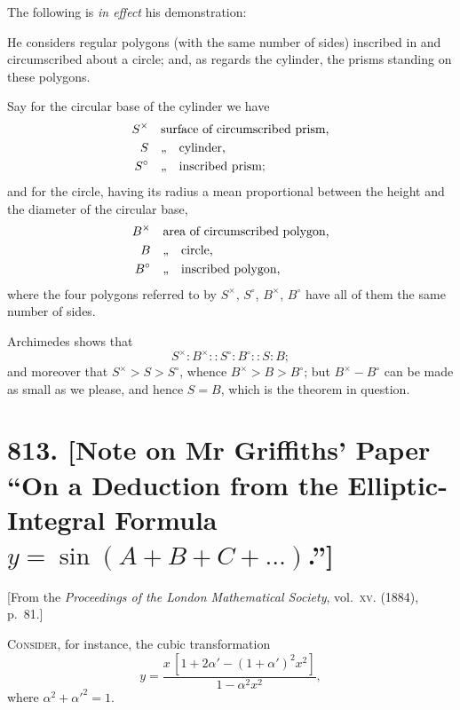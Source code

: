 \documentclass[11pt,a4paper]{article}
\theoremstyle{plain}
\theoremstyle{definition}
\theoremstyle{remark}
\begin{document}
The following is \textit{in effect} his demonstration:

He considers regular polygons (with the same number of sides) inscribed in and circumscribed about a circle; and, as regards the cylinder, the prisms standing on these polygons.

Say for the circular base of the cylinder we have
\begin{align*}
S^{\times} &\quad \text{surface of circumscribed prism,}\\
S &\quad \text{,,\quad cylinder,}\\
S^{\circ} &\quad \text{,,\quad inscribed prism;}
\end{align*}
and for the circle, having its radius a mean proportional between the height and the diameter of the circular base,
\begin{align*}
B^{\times} &\quad \text{area of circumscribed polygon,}\\
B &\quad \text{,,\quad circle,}\\
B^{\circ} &\quad \text{,,\quad inscribed polygon,}
\end{align*}
where the four polygons referred to by $S^{\times}$, $S^{\circ}$, $B^{\times}$, $B^{\circ}$ have all of them the same number of sides.

Archimedes shows that
\[
S^{\times} : B^{\times} :: S^{\circ} : B^{\circ} :: S : B;
\]
and moreover that $S^{\times} > S > S^{\circ}$, whence $B^{\times} > B > B^{\circ}$; but $B^{\times} - B^{\circ}$ can be made as small as we please, and hence $S = B$, which is the theorem in question.


\newpage
\section*{813. [Note on Mr Griffiths' Paper ``On a Deduction from the Elliptic-Integral Formula $y = \sin{(A+B+C+\ldots)}$.'']}

\begin{center}
\small[From the \textit{Proceedings of the London Mathematical Society}, vol.~\textsc{xv}. (1884), p.~81.]
\end{center}

\bigskip

\noindent
\textsc{Consider}, for instance, the cubic transformation
\[
y = \frac{x\,[1 + 2\alpha' - (1+\alpha')^2 x^2]}{1 - \alpha^2 x^2},
\]
where $\alpha^2 + \alpha'^2 = 1$.
\end{document}

